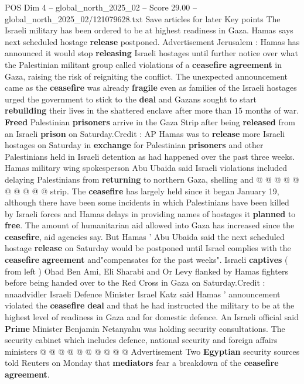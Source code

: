 \begin{textsample}{POS Dim 4 – global\_north\_2025\_02 – Score 29.00 – global\_north\_2025\_02/121079628.txt}  \label{ex:f4_pos_055}
Save articles for later Key points The Israeli military has been ordered to be at highest readiness in Gaza.
Hamas says next scheduled hostage \textbf{release} postponed.
Advertisement Jerusalem : Hamas has announced it would stop \textbf{releasing} Israeli hostages until further notice over what the Palestinian militant group called violations of a \textbf{ceasefire} \textbf{agreement} in Gaza, raising the risk of reigniting the conflict.
The unexpected announcement came as the \textbf{ceasefire} was already \textbf{fragile} even as families of the Israeli hostages urged the government to stick to the \textbf{deal} and Gazans sought to start \textbf{rebuilding} their lives in the shattered enclave after more than 15 months of war. \textbf{Freed} Palestinian \textbf{prisoners} arrive in the Gaza Strip after being \textbf{released} from an Israeli \textbf{prison} on Saturday.Credit : AP Hamas was to \textbf{release} more Israeli hostages on Saturday in \textbf{exchange} for Palestinian \textbf{prisoners} and other Palestinians held in Israeli detention as had happened over the past three weeks.
Hamas military wing spokesperson Abu Ubaida said Israeli violations included delaying Palestinians from \textbf{returning} to northern Gaza, shelling and @ @ @ @ @ @ @ @ @ @ strip.
The \textbf{ceasefire} has largely held since it began January 19, although there have been some incidents in which Palestinians have been killed by Israeli forces and Hamas delays in providing names of hostages it \textbf{planned} to \textbf{free}.
The amount of humanitarian aid allowed into Gaza has increased since the \textbf{ceasefire}, aid agencies say.
But Hamas ' Abu Ubaida said the next scheduled hostage \textbf{release} on Saturday would be postponed until Israel complies with the \textbf{ceasefire} \textbf{agreement} and"compensates for the past weeks".
Israeli \textbf{captives} ( from left ) Ohad Ben Ami, Eli Sharabi and Or Levy flanked by Hamas fighters before being handed over to the Red Cross in Gaza on Saturday.Credit : nnaadvidler Israeli Defence Minister Israel Katz said Hamas ' announcement violated the \textbf{ceasefire} \textbf{deal} and that he had instructed the military to be at the highest level of readiness in Gaza and for domestic defence.
An Israeli official said \textbf{Prime} Minister Benjamin Netanyahu was holding security consultations.
The security cabinet which includes defence, national security and foreign affairs ministers @ @ @ @ @ @ @ @ @ @ Advertisement Two \textbf{Egyptian} security sources told Reuters on Monday that \textbf{mediators} fear a breakdown of the \textbf{ceasefire} \textbf{agreement}.

\end{textsample}
